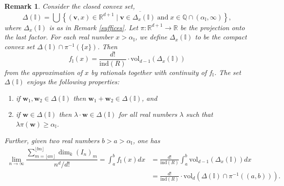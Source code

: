 \documentclass[12pt,a4paper]{amsart}
\theoremstyle{plain}
\newtheorem{remark}[theorem]{Remark}
\theoremstyle{definition}
\numberwithin{equation}{theorem}
\begin{document}
\begin{remark}\label{global_okounkov}
Consider the closed convex set, $$\Delta(\mathbb{I}) = \overline{\bigcup\left\{(\mathbf{v},x)\in \mathbb{R}^{d+1}\mid \mathbf{v}\in \Delta_x(\mathbb{I})\;\text{and}\;x\in \mathbb{Q}\cap (\alpha_{\mathbb{I}},\infty)\right\}},$$ where $\Delta_x(\mathbb{I})$ is as in Remark \ref{suffices}. Let $\pi\colon \mathbb{R}^{d+1}\to \mathbb{R}$ be the projection onto the last factor. For each real number $x>\alpha_{\mathbb{I}}$, we define $\Delta_x(\mathbb{I})$ to be the compact convex set $\Delta(\mathbb{I}) \cap \pi^{-1}(\{x\})$. Then
\begin{equation}\label{mult=vol}
f_{\mathbb{I}}(x) = \frac{d!}{\mathrm{ind}(R)}\cdot \mathrm{vol}_{d-1}\left(\Delta_x(\mathbb{I})\right)
\end{equation}
from the approximation of $x$ by rationals together with continuity of $f_{\mathbb{I}}$. The set $\Delta(\mathbb{I})$ enjoys the following properties:
\begin{enumerate}
 \item if $\mathbf{w}_1, \mathbf{w}_2 \in \Delta(\mathbb{I})$ then $\mathbf{w}_1 + \mathbf{w}_2 \in \Delta(\mathbb{I})$, and
 \item if $\mathbf{w} \in \Delta(\mathbb{I})$ then $\lambda\cdot\mathbf{w} \in \Delta(\mathbb{I})$ for all real numbers $\lambda$ such that $\lambda\pi(\mathbf{w}) \geq \alpha_{\mathbb{I}}$.
\end{enumerate}
Further, given two real numbers $b>a>\alpha_{\mathbb{I}}$, one has
\begin{align*}
 \lim_{n\to\infty}\dfrac{\sum_{m=\lfloor an\rfloor}^{\lfloor bn\rfloor}\dim_k {\left(I_n\right)}_m}{n^d/d!} = \int_a^b f_{\mathbb{I}}(x)dx &= \frac{d!}{\mathrm{ind}(R)}\int_a^b \mathrm{vol}_{d-1}\left(\Delta_x(\mathbb{I})\right)dx\\
 &= \frac{d!}{\mathrm{ind}(R)}\cdot \mathrm{vol}_{d}\left(\Delta(\mathbb{I}) \cap \pi^{-1}\left((a,b)\right)\right).
\end{align*}
\end{remark}
\end{document}
